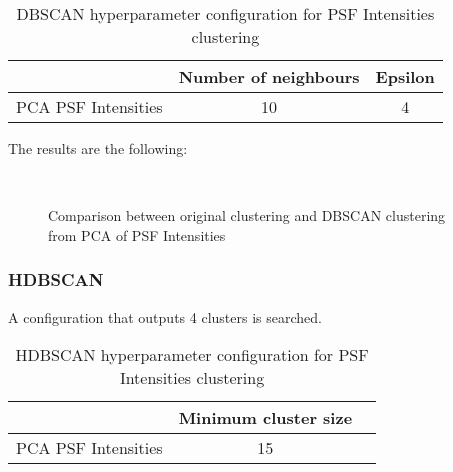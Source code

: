 			\begin{table}[h!]
				\centering
				\begin{tabular}{|c|c|c|}
					\hline
					& \textbf{Number of neighbours} & \textbf{Epsilon}\\
					\hline
					PCA PSF Intensities & 10 & 4\\
					\hline
				\end{tabular}
				\caption{DBSCAN hyperparameter configuration for PSF Intensities clustering}
			\end{table}
		
			The results are the following:
			
			\begin{figure*}[ht!]
				\centering
				\hspace{\fill}
				\\
					
				\hspace{\fill}
				\caption{Comparison between original clustering and DBSCAN clustering from PCA of PSF Intensities}
			\end{figure*}
			\FloatBarrier
			
		
		\subsubsection{HDBSCAN}
			
			A configuration that outputs 4 clusters is searched.
			
			\begin{table}[h!]
				\centering
				\begin{tabular}{|c|c|c|}
					\hline
					& \textbf{Minimum cluster size} \\
					\hline
					PCA PSF Intensities & 15 \\
					\hline
				\end{tabular}
				\caption{HDBSCAN hyperparameter configuration for PSF Intensities clustering}
			\end{table}
			\FloatBarrier
			
